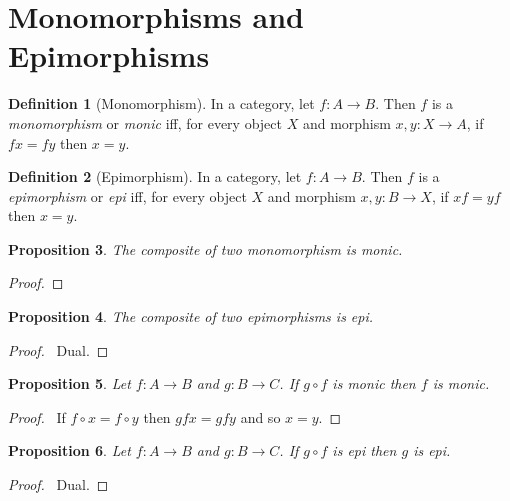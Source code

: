 \documentclass{book}
\let\qed\relax
\newtheorem{prop}{Proposition}[chapter]
\theoremstyle{definition}
\newtheorem{df}[prop]{Definition}
\begin{document}
\section{Monomorphisms and Epimorphisms}

\begin{df}[Monomorphism]
    In a category, let $f : A \rightarrow B$. Then $f$ is a \emph{monomorphism} or \emph{monic} iff, for every object $X$ and morphism $x,y : X \rightarrow A$, if $fx = fy$ then $x=y$.
\end{df}

\begin{df}[Epimorphism]
    In a category, let $f : A \rightarrow B$. Then $f$ is a \emph{epimorphism} or \emph{epi} iff, for every object $X$ and morphism $x,y : B \rightarrow X$, if $xf = yf$ then $x=y$.
\end{df}

\begin{prop}
    The composite of two monomorphism is monic.
\end{prop}

\begin{proof}
    \pf
    \qed
\end{proof}

\begin{prop}
    The composite of two epimorphisms is epi.
\end{prop}

\begin{proof}
    \pf\ Dual. \qed
\end{proof}

\begin{prop}
    Let $f : A \rightarrow B$ and $g : B \rightarrow C$. If $g \circ f$ is monic then $f$ is monic.
\end{prop}

\begin{proof}
    \pf\ If $f \circ x = f \circ y$ then $gfx = gfy$ and so $x = y$. \qed
\end{proof}

\begin{prop}
    Let $f : A \rightarrow B$ and $g : B \rightarrow C$. If $g \circ f$ is epi then $g$ is epi.
\end{prop}

\begin{proof}
    \pf\ Dual. \qed
\end{proof}
\end{document}
